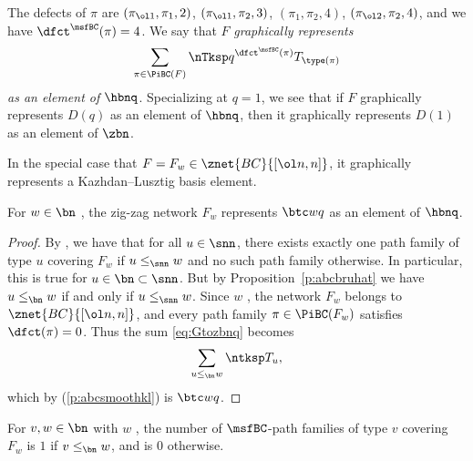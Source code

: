 The defects of $\pi$ are
$(\pi_{\ol1}, \pi_1, 2)$,
$(\pi_{\ol1}, \pi_2, 3)$,
$(\pi_1, \pi_2, 4)$,
$(\pi_{\ol2}, \pi_2, 4)$,
and we have $\dfct^{\msfBC}(\pi) = 4$.
We say that $F$ {\em graphically represents}
\begin{equation}\label{eq:Gtozbnq}
\sum_{\pi \in \PiBC(F)} \nTksp q^{\dfct^{\msfBC}(\pi)} T_{\type(\pi)}
\end{equation}
{\em as an element of $\hbnq$}.
Specializing at $q=1$, we see that if $F$ graphically represents
$D(q)$ as an element of $\hbnq$, then
it graphically represents
$D(1)$ as an element of $\zbn$.

In the special case that $F = F_w \in \znet{BC}{[\ol n,n]}$,
it graphically represents a Kazhdan--Lusztig basis element.
\begin{thm}\label{t:zigzagbc}
  For $w \in \bn$ \avoidingp, the zig-zag network $F_w$ represents
  $\btc wq$ as an element of $\hbnq$.
  \end{thm}
\begin{proof}
  By \cite[Lem.\,5.3]{SkanNNDCB}, we have that for all $u \in \snn$,
  there exists exactly one path family of type $u$ covering $F_w$
  if $u \leq_{\snn} w$ and no such path family otherwise.
  In particular, this is true for $u \in \bn \subset \snn$.
  But by Proposition~\ref{p:abcbruhat}
  we have $u \leq_{\bn} w$ if and only if $u \leq_{\snn} w$.
  Since $w$ \avoidsp, the network $F_w$ belongs to $\znet{BC}{[\ol n,n]}$,
  and every path family
  $\pi \in \PiBC(F_w)$ satisfies $\dfct(\pi) = 0$.  Thus the sum
  \eqref{eq:Gtozbnq} becomes
  \begin{equation*}
    \sum_{u \leq_{\bn} w} \ntksp T_u,
  \end{equation*}
  which by (\ref{p:abcsmoothkl}) is $\btc wq$.
\end{proof}

\begin{cor}\label{c:zigzagbc}
  For $v, w \in \bn$ with $w$ \avoidingp,
  the number of $\msfBC$-path families of type $v$ covering $F_w$ is
  $1$ if $v \leq_{\bn} w$, and is $0$ otherwise.
\end{cor}
